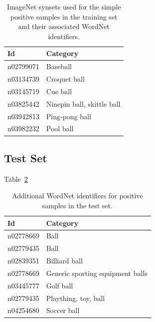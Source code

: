 \documentclass{llncs}
\begin{document}
{{			%
			\newcommand{\highlight}[1]{{#1}}
			\begin{table}
				\centering
				\caption{ImageNet synsets used for the simple positive samples in the training set and their associated WordNet \citep{fellbaum1998wordnet} identifiers.}
				\label{tab:positive_samples_simple}
				\begin{tabularx}{\textwidth}{lX}
					\toprule
					\textbf{Id} & \textbf{Category} \\
					\midrule
						\highlight{n02799071} & \highlight{Baseball} \\
						\highlight{n03134739} & \highlight{Croquet ball} \\
						\highlight{n03145719} & \highlight{Cue ball} \\
						\highlight{n03825442} & \highlight{Ninepin ball, skittle ball} \\
						\highlight{n03942813} & \highlight{Ping-pong ball} \\
						\highlight{n03982232} & \highlight{Pool ball} \\
					\bottomrule
				\end{tabularx}
			\end{table}
		
		}

		\subsection{Test Set} {

			Table~\ref{tab:test_set}

			\begin{table}
				\centering
				\caption{Additional WordNet identifiers for positive samples in the test set.}
				\label{tab:test_set}
				\begin{tabularx}{\textwidth}{lX}
					\toprule
					\textbf{Id} & \textbf{Category} \\
					\midrule
						n02778669 & Ball \\
						n02779435 & Ball \\
						n02839351 & Billiard ball \\
						n02778669 & Generic sporting equipment balls \\
						n03445777 & Golf ball \\
						n02779435 & Plaything, toy, ball \\
						n04254680 & Soccer ball \\
					\bottomrule
				\end{tabularx}
			\end{table}
		
}}
\end{document}
